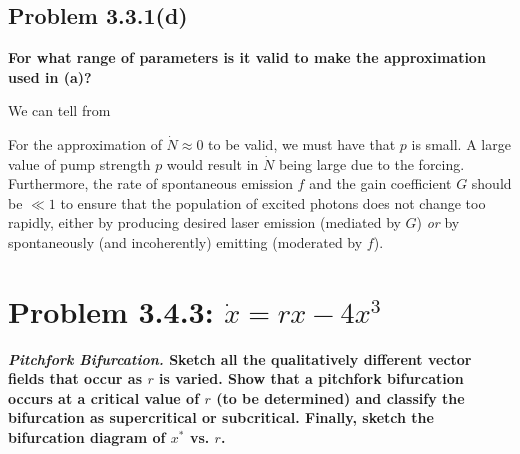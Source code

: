 \documentclass[draft]{agujournal2019}
\begin{document}
\subsection{Problem 3.3.1(d)}
\label{ssec:p4d}

\textbf{For what range of parameters is it valid to make the approximation used in (a)? }

We can tell from 


For the approximation of $\dot{N}\approx0$ to be valid, we must have that $p$ is small. A large value of pump strength $p$ would result in $\dot{N}$ being large due to the forcing. Furthermore, the rate of spontaneous emission $f$ and the gain coefficient $G$ should be $\ll1$ to ensure that the population of excited photons does not change too rapidly, either by producing desired laser emission (mediated by $G$) \emph{or} by spontaneously (and incoherently) emitting (moderated by $f$).



\section{Problem 3.4.3: $\dot x = rx - 4x^3$}
\label{sec:p5}

\textbf{\textit{Pitchfork Bifurcation.} Sketch all the qualitatively different vector fields that occur as $r$ is varied. Show that a pitchfork bifurcation occurs at a critical value of $r$ (to be determined) and classify the bifurcation as supercritical or subcritical. Finally, sketch the bifurcation diagram of $x^*$ vs. $r$. }
\end{document}
